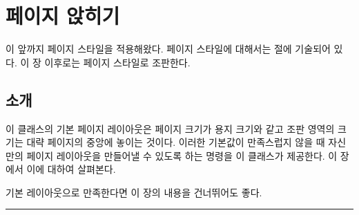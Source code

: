 \chapter{페이지 앉히기} \label{chap:layingpage}

이 앞까지  페이지 스타일을
적용해왔다. 페이지 스타일에 대해서는  절에
기술되어 있다. 이 장 이후로는  페이지 스타일로 조판한다.

\section{소개}

이 클래스의 기본 페이지 레이아웃은
페이지 크기가 용지 크기와 같고
조판 영역의 크기는 대략 페이지의 중앙에 놓이는 것이다.
이러한 기본값이 만족스럽지 않을 때 자신만의
페이지 레이아웃을 만들어낼 수 있도록 하는 명령을 이 클래스가 제공한다.
이 장에서 이에 대하여 살펴본다.

기본 레이아웃으로 만족한다면 이 장의 내용을 건너뛰어도 좋다.

\fancybreak{}

